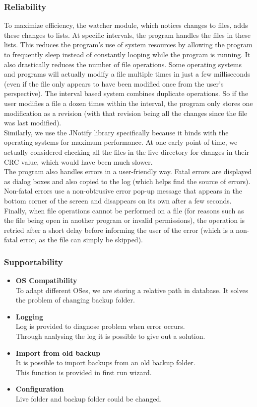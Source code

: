 \documentclass[12pt,a4paper]{article}
\begin{document}
\subsubsection{Reliability}
To maximize efficiency, the watcher module, which notices changes to files, adds these changes to lists. At specific intervals, the program handles the files in these lists. This reduces the program's use of system resources by allowing the program to frequently sleep instead of constantly looping while the program is running. It also drastically reduces the number of file operations. Some operating systems and programs will actually modify a file multiple times in just a few milliseconds (even if the file only appears to have been modified once from the user's perspective). The interval based system combines duplicate operations. So if the user modifies a file a dozen times within the interval, the program only stores one modification as a revision (with that revision being all the changes since the file was last modified).
\\Similarly, we use the JNotify library specifically because it binds with the operating systems for maximum performance. At one early point of time, we actually considered checking all the files in the live directory for changes in their CRC value, which would have been much slower.
\\The program also handles errors in a user-friendly way. Fatal errors are displayed as dialog boxes and also copied to the log (which helps find the source of errors). Non-fatal errors use a non-obtrusive error pop-up message that appears in the bottom corner of the screen and disappears on its own after a few seconds.
Finally, when file operations cannot be performed on a file (for reasons such as the file being open in another program or invalid permissions), the operation is retried after a short delay before informing the user of the error (which is a non-fatal error, as the file can simply be skipped).


\subsubsection{Supportability}
\begin{itemize}
	\item \textbf{OS Compatibility} \\
	To adapt different OSes, we are storing a relative path in database. It solves the problem of changing backup folder.
	\item \textbf{Logging} \\
	Log is provided to diagnose problem when error occurs.\\
	Through analysing the log it is possible to give out a solution.
	\item \textbf{Import from old backup} \\
	It is possible to import backups from an old backup folder.\\
	This function is provided in first run wizard.
	\item \textbf{Configuration} \\
	Live folder and backup folder could be changed.
\end{itemize}
\end{document}
